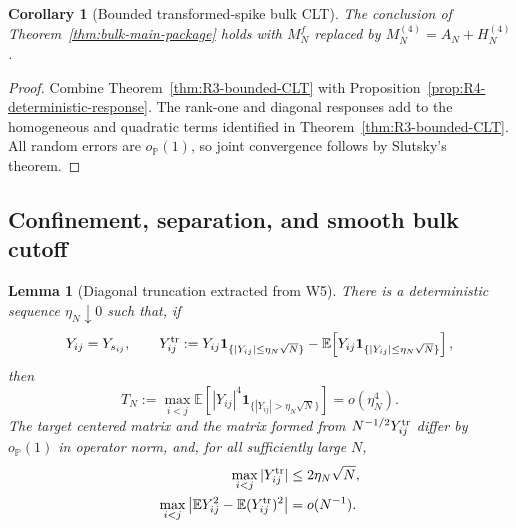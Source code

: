 \documentclass[11pt]{article}
\newtheorem{lemma}[theorem]{Lemma}
\newtheorem{corollary}[theorem]{Corollary}
\theoremstyle{definition}
\theoremstyle{remark}
\newcommand{\E}{\mathbb E}
\newcommand{\one}{\mathbf 1}
\begin{document}
\begin{corollary}[Bounded transformed-spike bulk CLT]
\label{cor:R4-bounded-full-CLT}
The conclusion of Theorem~\ref{thm:bulk-main-package} holds with
\(M_N^f\) replaced by \(M_N^{(4)}=A_N+H_N^{(4)}\).
\end{corollary}

\begin{proof}
Combine Theorem~\ref{thm:R3-bounded-CLT} with
Proposition~\ref{prop:R4-deterministic-response}.  The rank-one and diagonal
responses add to the homogeneous and quadratic terms identified in
Theorem~\ref{thm:R3-bounded-CLT}.
All random errors are \(o_{\mathbb P}(1)\), so joint convergence follows by
Slutsky's theorem.
\end{proof}

\subsection{Confinement, separation, and smooth bulk cutoff}

\begin{lemma}[Diagonal truncation extracted from W5]
\label{lem:R4-diagonal-truncation}
There is a deterministic sequence \(\eta_N\downarrow0\) such that, if
\[
 Y_{ij}=Y_{s_{ij}},\qquad
 Y_{ij}^{\rm tr}
 :=Y_{ij}\one_{\{|Y_{ij}|\le\eta_N\sqrt N\}}
 -\E\!\left[Y_{ij}\one_{\{|Y_{ij}|\le\eta_N\sqrt N\}}\right],
\]
then
\begin{equation}\label{eq:R4-uniform-tail-choice}
 T_N:=\max_{i<j}
 \E\!\left[|Y_{ij}|^4
 \one_{\{|Y_{ij}|>\eta_N\sqrt N\}}\right]
 =o(\eta_N^4).
\end{equation}
The target centered matrix and the matrix formed from
\(N^{-1/2}Y_{ij}^{\rm tr}\) differ by \(o_{\mathbb P}(1)\) in operator norm,
and, for all sufficiently large \(N\),
\begin{align}
 \max_{i<j}|Y_{ij}^{\rm tr}|
 &\le2\eta_N\sqrt N,\label{eq:R4-trunc-max}\\
 \max_{i<j}\left|
 \E Y_{ij}^2-\E(Y_{ij}^{\rm tr})^2
 \right|&=o(N^{-1}).\label{eq:R4-trunc-variance}
\end{align}
\end{lemma}
\end{document}
